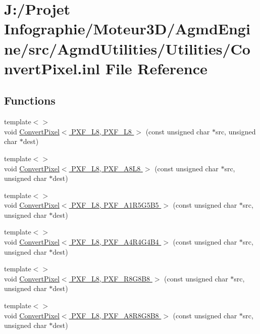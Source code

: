 \hypertarget{_convert_pixel_8inl}{\section{J\-:/\-Projet Infographie/\-Moteur3\-D/\-Agmd\-Engine/src/\-Agmd\-Utilities/\-Utilities/\-Convert\-Pixel.inl File Reference}
\label{_convert_pixel_8inl}
}
\subsection*{Functions}
\begin{DoxyCompactItemize}
\item 
{\footnotesize template$<$$>$ }\\void \hyperlink{_convert_pixel_8inl_afc29fce01775bb6e56912219e0ee3d3d}{Convert\-Pixel$<$ P\-X\-F\-\_\-\-L8, P\-X\-F\-\_\-\-L8 $>$} (const unsigned char $\ast$src, unsigned char $\ast$dest)
\item 
{\footnotesize template$<$$>$ }\\void \hyperlink{_convert_pixel_8inl_a24fabc100db5b6d2adf23050e4925827}{Convert\-Pixel$<$ P\-X\-F\-\_\-\-L8, P\-X\-F\-\_\-\-A8\-L8 $>$} (const unsigned char $\ast$src, unsigned char $\ast$dest)
\item 
{\footnotesize template$<$$>$ }\\void \hyperlink{_convert_pixel_8inl_af4c07bfc491c3977a5894a734156a59e}{Convert\-Pixel$<$ P\-X\-F\-\_\-\-L8, P\-X\-F\-\_\-\-A1\-R5\-G5\-B5 $>$} (const unsigned char $\ast$src, unsigned char $\ast$dest)
\item 
{\footnotesize template$<$$>$ }\\void \hyperlink{_convert_pixel_8inl_a583b9f9a0fa5a68dcad97f0d4c24c967}{Convert\-Pixel$<$ P\-X\-F\-\_\-\-L8, P\-X\-F\-\_\-\-A4\-R4\-G4\-B4 $>$} (const unsigned char $\ast$src, unsigned char $\ast$dest)
\item 
{\footnotesize template$<$$>$ }\\void \hyperlink{_convert_pixel_8inl_ac52d7adba712bb533ae95d42428b9bf5}{Convert\-Pixel$<$ P\-X\-F\-\_\-\-L8, P\-X\-F\-\_\-\-R8\-G8\-B8 $>$} (const unsigned char $\ast$src, unsigned char $\ast$dest)
\item 
{\footnotesize template$<$$>$ }\\void \hyperlink{_convert_pixel_8inl_a6a0287d0bb3e226c7eac450edd827570}{Convert\-Pixel$<$ P\-X\-F\-\_\-\-L8, P\-X\-F\-\_\-\-A8\-R8\-G8\-B8 $>$} (const unsigned char $\ast$src, unsigned char $\ast$dest)

\end{DoxyCompactItemize}
